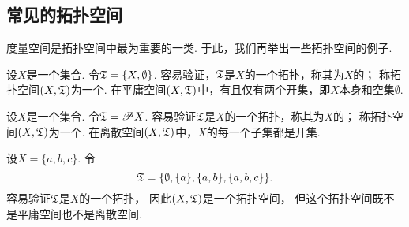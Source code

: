 \subsection{常见的拓扑空间}
度量空间是拓扑空间中最为重要的一类.
于此，我们再举出一些拓扑空间的例子.

\begin{example}[平庸空间]
设\(X\)是一个集合.
令\({\mathfrak T}=\{X,\emptyset\}\).
容易验证，\({\mathfrak T}\)是\(X\)的一个拓扑，称其为\(X\)的；
称拓扑空间\((X,{\mathfrak T})\)为一个.
在平庸空间\((X,{\mathfrak T})\)中，有且仅有两个开集，即\(X\)本身和空集\(\emptyset\).
\end{example}

\begin{example}[离散空间]
设\(X\)是一个集合.
令\({\mathfrak T}=\mathscr{P} X\).
容易验证\({\mathfrak T}\)是\(X\)的一个拓扑，称其为\(X\)的；
称拓扑空间\((X,{\mathfrak T})\)为一个.
在离散空间\((X,{\mathfrak T})\)中，\(X\)的每一个子集都是开集.
\end{example}

\begin{example}\label{example:拓扑学.常见的拓扑空间3}
设\(X = \{a,b,c\}\).
令\begin{equation*}
	{\mathfrak T} = \{
		\emptyset,
		\{a\},
		\{a,b\},
		\{a,b,c\}
	\}.
\end{equation*}
容易验证\({\mathfrak T}\)是\(X\)的一个拓扑，
因此\((X,{\mathfrak T})\)是一个拓扑空间，
但这个拓扑空间既不是平庸空间也不是离散空间.
\end{example}

